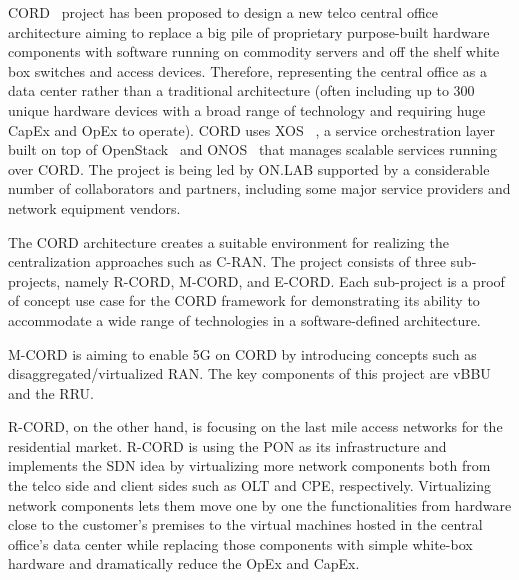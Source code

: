 \ac{CORD}~\cite{7588276} project has been proposed to design a new telco central office architecture aiming to replace a big pile of proprietary purpose-built hardware components with software running on commodity servers and off the shelf white box switches and access devices. Therefore, representing the central office as a data center rather than a traditional architecture (often including up to 300 unique hardware devices with a broad range of technology and requiring huge \ac{CapEx} and \ac{OpEx} to operate). \ac{CORD} uses XOS ~\cite{XOSUnle92:online}, a service orchestration layer built on top of OpenStack~\cite{OpenStack:online} and ONOS~\cite{berde2014onos} that manages scalable services running over \ac{CORD}. The project is being led by ON.LAB supported by a considerable number of collaborators and partners, including some major service providers and network equipment vendors.

The \ac{CORD} architecture creates a suitable environment for realizing the centralization approaches such as \ac{C-RAN}. The project consists of three sub-projects, namely \ac{R-CORD}, \ac{M-CORD}, and \ac{E-CORD}. Each sub-project is a proof of concept use case for the \ac{CORD} framework for demonstrating its ability to accommodate a wide range of technologies in a software-defined architecture.

\ac{M-CORD} is aiming to enable \ac{5G} on \ac{CORD} by introducing concepts such as disaggregated/virtualized \ac{RAN}. The key components of this project are \ac{vBBU} and the \ac{RRU}.

\ac{R-CORD}, on the other hand, is focusing on the last mile access networks for the residential market. \ac{R-CORD} is using the \ac{PON} as its infrastructure and implements the \ac{SDN} idea by virtualizing more network components both from the telco side and client sides such as \ac{OLT} and \ac{CPE}, respectively. Virtualizing network components lets them move one by one the functionalities from hardware close to the customer's premises to the virtual machines hosted in the central office's data center while replacing those components with simple white-box hardware and dramatically reduce the \ac{OpEx} and \ac{CapEx}.


